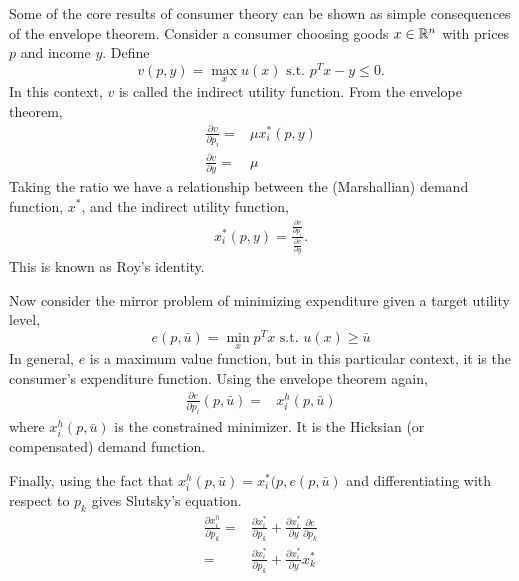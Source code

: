 \begin{example}
  Some of the core results of consumer theory can be shown as simple
  consequences of the envelope theorem. Consider a consumer choosing
  goods $x \in \mathbb{R}^n$ with prices $p$ and income $y$. Define 
  \[ v(p,y) = \max_x u(x) \text{ s.t. } p^T x - y \leq 0. \]
  In this context, $v$ is called the indirect utility function. From
  the envelope theorem,
  \begin{align*}
    \frac{\partial v}{\partial p_i} = & \mu x_i^*(p,y) \\
    \frac{\partial v}{\partial y} = & \mu
  \end{align*}
  Taking the ratio we have a relationship between the (Marshallian)
  demand function, $x^*$, and the indirect utility function,
  \begin{align*}
    x_i^*(p,y) = \frac{ \frac{\partial v}{\partial p_i}}
    {\frac{\partial v}{\partial y}}.
  \end{align*}
  This is known as Roy's identity.

  Now consider the mirror problem of minimizing expenditure given a
  target utility level,
  \[ e(p,\bar{u}) = \min_x p^T x \text{ s.t. } u(x) \geq \bar{u} \]
  In general, $e$ is a maximum value function, but in this particular
  context, it is the consumer's expenditure function. Using the
  envelope theorem again,
  \begin{align*}
    \frac{\partial e}{\partial p_i}(p,\bar{u}) = & x_i^h(p,\bar{u})
  \end{align*}
  where $x_i^h(p,\bar{u})$ is the constrained minimizer. It is the Hicksian
  (or compensated) demand function. 

  Finally, using the fact that $x_i^h(p,\bar{u}) =
  x_i^*(p,e(p,\bar{u})$ and differentiating with respect to $p_k$
  gives Slutsky's equation.
  \begin{align*}
    \frac{\partial x_i^h}{\partial p_k} = & \frac{\partial
      x_i^*}{\partial p_k} + \frac{\partial x_i^*}{\partial y}
    \frac{\partial e}{\partial p_k} \\
    = & \frac{\partial
      x_i^*}{\partial p_k} + \frac{\partial x_i^*}{\partial y}
    x_k^*
  \end{align*}   
\end{example}

